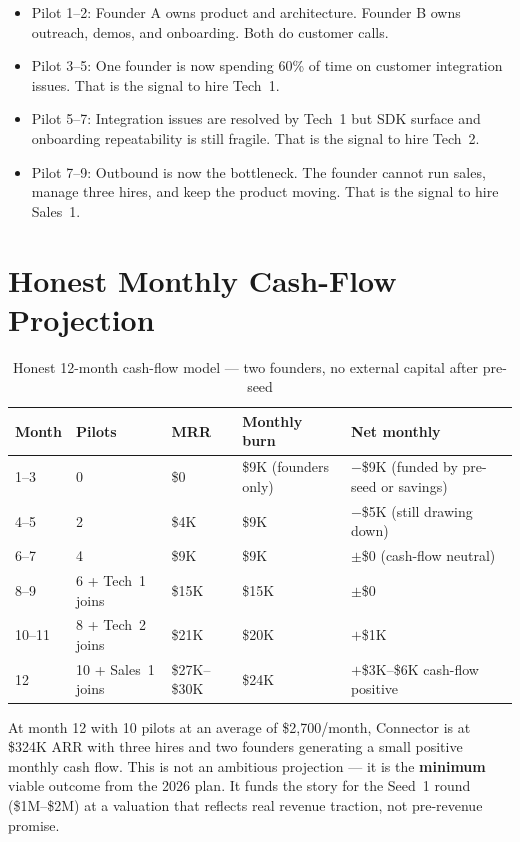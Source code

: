 \begin{itemize}[leftmargin=1.5em, itemsep=3pt]
  \item Pilot 1--2: Founder A owns product and architecture. Founder B owns
        outreach, demos, and onboarding. Both do customer calls.
  \item Pilot 3--5: One founder is now spending 60\% of time on customer
        integration issues. That is the signal to hire Tech~1.
  \item Pilot 5--7: Integration issues are resolved by Tech~1 but SDK
        surface and onboarding repeatability is still fragile. That is the
        signal to hire Tech~2.
  \item Pilot 7--9: Outbound is now the bottleneck. The founder cannot run
        sales, manage three hires, and keep the product moving. That is the
        signal to hire Sales~1.
\end{itemize}

\section*{Honest Monthly Cash-Flow Projection}

\begin{table}[H]
\centering
\renewcommand{\arraystretch}{1.5}
\begin{tabularx}{\textwidth}{@{}lXXXX@{}}
\toprule
\textbf{Month} & \textbf{Pilots} & \textbf{MRR} & \textbf{Monthly burn} &
\textbf{Net monthly} \\
\midrule
1--3  & 0 & \$0 & \$9K (founders only) &
         $-$\$9K (funded by pre-seed or savings) \\
4--5  & 2 & \$4K & \$9K & $-$\$5K (still drawing down) \\
6--7  & 4 & \$9K & \$9K & $\pm$\$0 (cash-flow neutral) \\
8--9  & 6 + Tech~1 joins & \$15K & \$15K & $\pm$\$0 \\
10--11 & 8 + Tech~2 joins & \$21K & \$20K & $+$\$1K \\
12    & 10 + Sales~1 joins & \$27K--\$30K & \$24K &
         $+$\$3K--\$6K cash-flow positive \\
\bottomrule
\end{tabularx}
\caption{Honest 12-month cash-flow model --- two founders, no external capital after pre-seed}
\end{table}

\noindent At month 12 with 10 pilots at an average of \$2,700/month, Connector
is at \$324K ARR with three hires and two founders generating a small positive
monthly cash flow. This is not an ambitious projection --- it is the
\textbf{minimum} viable outcome from the 2026 plan. It funds the story for
the Seed~1 round (\$1M--\$2M) at a valuation that reflects real revenue
traction, not pre-revenue promise.

